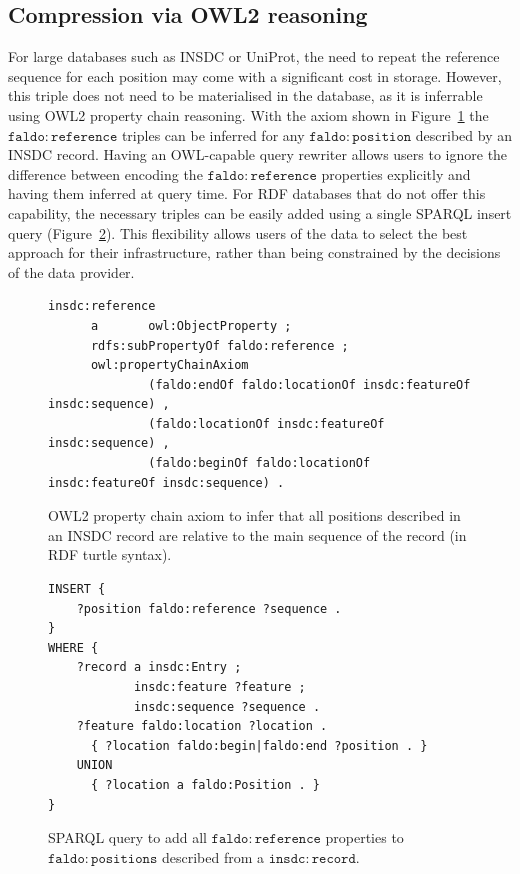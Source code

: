 \subsection*{Compression via OWL2 reasoning}
For large databases such as INSDC or UniProt,
the need to repeat the reference sequence for each position may come with a significant cost in storage.
However, this triple does not need to be materialised in the database, as it is inferrable using OWL2 property chain reasoning.
With the axiom shown in Figure~\ref{owl:chainProperty} the $\mathtt{faldo\colon{}reference}$ triples can be inferred for any $\mathtt{faldo\colon{}position}$ described by an INSDC record.
Having an OWL-capable query rewriter allows users to ignore the difference between encoding the $\mathtt{faldo\colon{}reference}$ properties explicitly and having them inferred at query time.
For RDF databases that do not offer this capability,
the necessary triples can be easily added using a single SPARQL insert query (Figure~\ref{sparql:chainProperty}).
This flexibility allows users of the data to select the best approach for their infrastructure, rather than being constrained by the decisions of the data provider.

\begin{figure}
\begin{shaded}
\small
\begin{verbatim}
insdc:reference
      a       owl:ObjectProperty ;
      rdfs:subPropertyOf faldo:reference ;
      owl:propertyChainAxiom
              (faldo:endOf faldo:locationOf insdc:featureOf insdc:sequence) , 
              (faldo:locationOf insdc:featureOf insdc:sequence) , 
              (faldo:beginOf faldo:locationOf insdc:featureOf insdc:sequence) .

\end{verbatim}
\end{shaded}
\caption{OWL2 property chain axiom to infer that all positions described in an INSDC record are relative to the main sequence of the record (in RDF turtle syntax).}
\label{owl:chainProperty}
\end{figure}

\begin{figure}
\begin{shaded}
\small
\begin{verbatim}
INSERT {
    ?position faldo:reference ?sequence .
}
WHERE {
    ?record a insdc:Entry ;
            insdc:feature ?feature ;
            insdc:sequence ?sequence .
    ?feature faldo:location ?location .
      { ?location faldo:begin|faldo:end ?position . }
    UNION
      { ?location a faldo:Position . }
}
\end{verbatim}
\end{shaded}
\caption{SPARQL query to add all $\mathtt{faldo\colon{}reference}$ properties to $\mathtt{faldo\colon{}positions}$ described from a $\mathtt{insdc\colon{}record}$.}
\label{sparql:chainProperty}
\end{figure}

